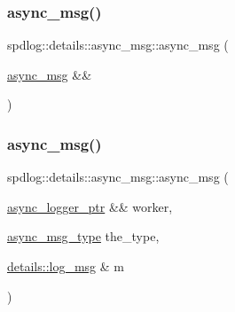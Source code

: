 \mbox{\label{structspdlog_1_1details_1_1async__msg_a2e618e34ed69ba387e8e5f069543f94a}} 
\subsubsection{\texorpdfstring{async\+\_\+msg()}{async\_msg()}\hspace{0.1cm}{\footnotesize\ttfamily [3/6]}}
{\footnotesize\ttfamily spdlog\+::details\+::async\+\_\+msg\+::async\+\_\+msg (\begin{DoxyParamCaption}\item[{\hyperlink{structspdlog_1_1details_1_1async__msg}{async\+\_\+msg} \&\&}]{ }\end{DoxyParamCaption})\hspace{0.3cm}{\ttfamily [default]}}

\mbox{\label{structspdlog_1_1details_1_1async__msg_aa525d6ee1ca7b82755a0f39b62283638}} 
\subsubsection{\texorpdfstring{async\+\_\+msg()}{async\_msg()}\hspace{0.1cm}{\footnotesize\ttfamily [4/6]}}
{\footnotesize\ttfamily spdlog\+::details\+::async\+\_\+msg\+::async\+\_\+msg (\begin{DoxyParamCaption}\item[{\hyperlink{namespacespdlog_1_1details_a9b6989c16b6150f7e4658ea2aee01bc2}{async\+\_\+logger\+\_\+ptr} \&\&}]{worker,  }\item[{\hyperlink{namespacespdlog_1_1details_a22274995cf879a5d0a08d1f7513ee4fb}{async\+\_\+msg\+\_\+type}}]{the\+\_\+type,  }\item[{\hyperlink{structspdlog_1_1details_1_1log__msg}{details\+::log\+\_\+msg} \&}]{m }\end{DoxyParamCaption})\hspace{0.3cm}{\ttfamily [inline]}}



